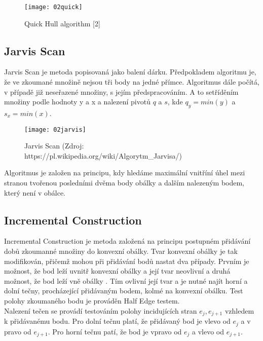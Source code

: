 \documentclass{article}
\begin{document}
\begin{figure}[ht]
\begin{center}
\texttt{[image: 02quick]} %
\caption{Quick Hull algorithm [2]}
\label{fig:wind}
\end{center}
\end{figure}

\subsection{Jarvis Scan}
Jarvis Scan je metoda popisovaná jako balení dárku. Předpokladem algoritmu je, že ve zkoumané množině nejsou tři body na jedné přímce. Algoritmus dále počítá, v případě již neseřazené množiny, s jejím předspracováním. A to setříděním množiny podle hodnoty y a x a nalezení pivotů $q$ a $s$, kde $q_y = min(y)$ a $s_x = min(x)$. 

\begin{figure}[h]
\begin{center}
\texttt{[image: 02jarvis]} %
\caption{Jarvis Scan (Zdroj: https://pl.wikipedia.org/wiki/Algorytm\_Jarvisa/)}
\label{fig:ray}
\end{center}
\end{figure}

Algoritmus je založen na principu, kdy hledáme maximální vnitříní úhel mezi stranou tvořenou posledními dvěma body obálky a dalším nalezeným bodem, který není v obálce.

\subsection{Incremental Construction}
Incremental Construction je metoda založená na principu postupném přidávání dobů zkoumanné množiny do konvexní obálky. Tvar konvexní obálky je tak modifikován, přičemž mohou při přidávání bodů nastat dva případy. Prvním je možnost, že bod leží uvnitř konvexní obálky a její tvar neovlivní a druhá možnost, že bod leží vně obálky . Tím ovlivní její tvar a je nutné najít horní a dolní tečny, procházející přidávaným bodem, kolmé na konvexní obálku. Test polohy zkoumaného bodu je prováděn Half Edge testem.\\

Nalezení tečen se provádí testováním polohy incidujících stran $e_j, e_{j+1}$ vzhledem k přidávanému bodu. Pro dolní tečnu platí, že přidávaný bod je vlevo od $e_j$ a v pravo od $e_{j+1}$. Pro horní tečnu patí, že bod je vpravo od $e_j$ a vlevo od $e_{j+1}$.
\end{document}
